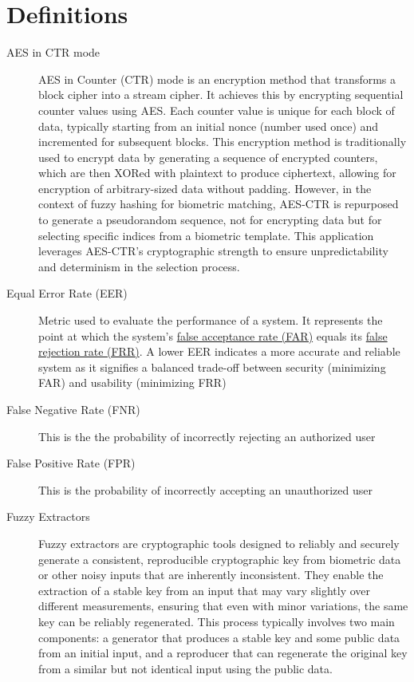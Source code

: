 \newpage
\section{Definitions}
\begin{description}
    \item[AES in CTR mode] \label{def:AES CTR mode} AES in Counter (CTR) mode is an encryption method that transforms a block cipher into a stream cipher. It achieves this by encrypting sequential counter values using AES. Each counter value is unique for each block of data, typically starting from an initial nonce (number used once) and incremented for subsequent blocks. This encryption method is traditionally used to encrypt data by generating a sequence of encrypted counters, which are then XORed with plaintext to produce ciphertext, allowing for encryption of arbitrary-sized data without padding. However, in the context of fuzzy hashing for biometric matching, AES-CTR is repurposed to generate a pseudorandom sequence, not for encrypting data but for selecting specific indices from a biometric template. This application leverages AES-CTR's cryptographic strength to ensure unpredictability and determinism in the selection process.

    \item[Equal Error Rate (EER)] \label{def:EER} Metric used to evaluate the performance of a system. It represents the point at which the system's \hyperref[def:FAR]{false acceptance rate (FAR)} equals its \hyperref[def:FRR]{false rejection rate (FRR)}. A lower EER indicates a more accurate and reliable system as it signifies a balanced trade-off between security (minimizing FAR) and usability (minimizing FRR)

    \item[False Negative Rate (FNR)] \label{def:FNR} This is the the probability of incorrectly rejecting an authorized user

    \item[False Positive Rate (FPR)] \label{def:FPR} This is the probability of incorrectly accepting an unauthorized user

    \item[Fuzzy Extractors] \label{def:Fuzzy_Extractors} Fuzzy extractors are cryptographic tools designed to reliably and securely generate a consistent, reproducible cryptographic key from biometric data or other noisy inputs that are inherently inconsistent. They enable the extraction of a stable key from an input that may vary slightly over different measurements, ensuring that even with minor variations, the same key can be reliably regenerated. This process typically involves two main components: a generator that produces a stable key and some public data from an initial input, and a reproducer that can regenerate the original key from a similar but not identical input using the public data.


\end{description}
